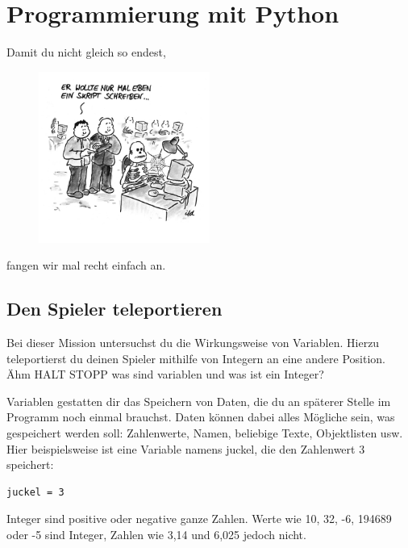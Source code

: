 \section{Programmierung mit Python}

Damit du nicht gleich so endest,
\begin{figure}[H]
\includegraphics[width=0.5\textwidth]{Bilder/mal_eben_ein_skript_schreiben.jpg} %
\end{figure}
fangen wir mal recht einfach an.

\subsection{Den Spieler teleportieren}

Bei  dieser  Mission  untersuchst  du  die  Wirkungsweise  von  Variablen. 
Hierzu  teleportierst  du  deinen  Spieler  mithilfe  von  Integern  an  eine 
andere Position.
Ähm HALT STOPP was sind variablen und was ist ein Integer? 

Variablen gestatten dir das Speichern von Daten, die du an späterer Stelle im Programm  noch  einmal  brauchst. Daten können  dabei  alles  Mögliche  sein, was   gespeichert   werden   soll:   Zahlenwerte,   Namen,   beliebige  Texte, Objektlisten usw. Hier beispielsweise ist eine Variable namens juckel, die den Zahlenwert 3 speichert: 

\lstset{language=Python}
\lstset{frame=lines}
\lstset{basicstyle=\footnotesize}
\begin{lstlisting}
juckel = 3
\end{lstlisting}

Integer sind positive oder negative ganze Zahlen. Werte wie 10, 32, -6, 194689 oder -5 sind Integer, Zahlen wie 3,14 und 6,025 jedoch nicht.

